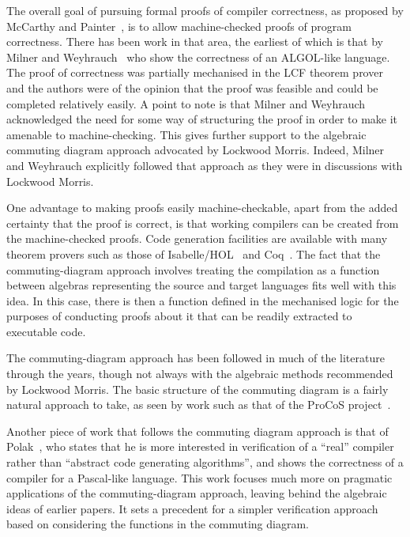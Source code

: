 \documentclass[a4paper,10pt]{report}
\begin{document}
The overall goal of pursuing formal proofs of compiler correctness, as proposed
by McCarthy and Painter~\cite{mccarthy1967}, is to allow machine-checked proofs
of program correctness. There has been work in that area, the earliest of which
is that by Milner and Weyhrauch~\cite{milner1972} who show the correctness of an
ALGOL-like language. The proof of correctness was partially mechanised in the
LCF theorem prover~\cite{milner1972a} and the authors were of the opinion that
the proof was feasible and could be completed relatively easily. A point to note
is that Milner and Weyhrauch acknowledged the need for some way of structuring
the proof in order to make it amenable to machine-checking. This gives further
support to the algebraic commuting diagram approach advocated by Lockwood
Morris. Indeed, Milner and Weyhrauch explicitly followed that approach as they
were in discussions with Lockwood Morris.

One advantage to making proofs easily machine-checkable, apart from the added
certainty that the proof is correct, is that working compilers can be created
from the machine-checked proofs.  Code generation facilities are available with
many theorem provers such as those of Isabelle/HOL~\cite{haftmann2007} and
Coq~\cite{letouzey2003, letouzey2008}. The fact that the commuting-diagram
approach involves treating the compilation as a function between algebras
representing the source and target languages fits well with this idea. In this
case, there is then a function defined in the mechanised logic for the purposes
of conducting proofs about it that can be readily extracted to executable code.

The commuting-diagram approach has been followed in much of the literature
through the years, though not always with the algebraic methods recommended by
Lockwood Morris.  The basic structure of the commuting diagram is a fairly
natural approach to take, as seen by work such as that of the ProCoS
project~\cite{buth1992}.

Another piece of work that follows the commuting diagram approach is that of
Polak~\cite{polak1981}, who states that he is more interested in verification of
a ``real'' compiler rather than ``abstract code generating algorithms'', and
shows the correctness of a compiler for a Pascal-like language.  This work
focuses much more on pragmatic applications of the commuting-diagram approach,
leaving behind the algebraic ideas of earlier papers.  It sets a precedent for a
simpler verification approach based on considering the functions in the
commuting diagram.
\end{document}
